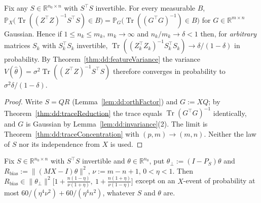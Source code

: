 \begin{theorem}\label{thm:dd:featureVarianceProb}
  \leanok
Fix any $S\in\mathbb R^{n_0\times n}$ with $S^\top S$ invertible. For every measurable $B$,
$\mathbb P_X\bigl(\operatorname{Tr}((Z^\top Z)^{-1}S^\top S)\in B\bigr)=\mathbb P_G\bigl(\operatorname{Tr}((G^\top G)^{-1})\in B\bigr)$ for $G\in\mathbb R^{m\times n}$ Gaussian. Hence if $1\le n_k\le m_k$, $m_k\to\infty$ and
$n_k/m_k\to\delta<1$ then, for \emph{arbitrary} matrices $S_k$ with $S_k^\top S_k$ invertible,
$\operatorname{Tr}((Z_k^\top Z_k)^{-1}S_k^\top S_k)\to\delta/(1-\delta)$ in probability. By Theorem~\ref{thm:dd:featureVariance} the variance $V(\hat\theta)=\sigma^2\operatorname{Tr}((Z^\top Z)^{-1}S^\top S)$ therefore converges in probability to $\sigma^2\delta/(1-\delta)$.
\end{theorem}

\begin{proof}
  \leanok
Write $S=QR$ (Lemma~\ref{lem:dd:orthFactor}) and $G:=XQ$; by Theorem~\ref{thm:dd:traceReduction} the trace equals $\operatorname{Tr}(G^\top G)^{-1}$ identically, and $G$ is Gaussian by Lemma~\ref{lem:dd:invariance}(2). The limit is
Theorem~\ref{thm:dd:traceConcentration} with $(p,m)\to(m,n)$. Neither the law of $S$ nor its independence from $X$ is used.
\end{proof}

\begin{theorem}\label{thm:dd:featureBiasFixedS}
  \leanok
Fix $S\in\mathbb R^{n_0\times n}$ with $S^\top S$ invertible and $\theta\in\mathbb R^{n_0}$, put $\theta_\perp:=(I-P_S)\theta$ and $R_{\mathrm{bias}}:=\|(MX-I)\theta\|^2$, $\nu:=m-n+1$, $0<\eta<1$.
Then $R_{\mathrm{bias}}\in\|\theta_\perp\|^2\bigl[1+\tfrac{n(1-\eta)}{\nu(1+\eta)},\ 1+\tfrac{n(1+\eta)}{\nu(1-\eta)}\bigr]$ except on an $X$-event of probability at most $60/(\eta^4\nu^2)+60/(\eta^4n^2)$, whatever $S$ and $\theta$ are.
\end{theorem}

